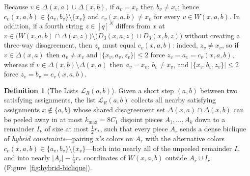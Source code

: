 \documentclass[11pt]{article}
\theoremstyle{definition}
\newtheorem{definition}[theorem]{Definition}
\theoremstyle{remark}
\begin{document}
Because $v \in \Delta(x, a) \cup \Delta(x, b)$, if $a_v = x_v$ then $b_v \ne x_v$; hence $c_v(x, a, b) \in \{a_v, b_v\} \setminus \{x_v\}$ and $c_v(x, a, b) \ne x_v$ for every $v \in W(x, a, b)$. In addition, if a fourth string $z \in [q]^N$ differs from $x$ at $v \in \bigl(W(x, a, b) \cap \Delta(x, z)\bigr) \setminus \bigl(D_3(x, a, z) \cup D_3(x, b, z)\bigr)$ without creating a three-way disagreement, then $z_v$ must equal $c_v(x, a, b)$: indeed, $z_v \ne x_v$, so if $v \in \Delta(x, a)$ then $a_v \ne x_v$ and $|\{x_v, a_v, z_v\}| \le 2$ force $z_v = a_v = c_v(x, a, b)$, whereas if $v \in \Delta(x, b) \setminus \Delta(x, a)$ then $a_v = x_v$, $b_v \ne x_v$, and $|\{x_v, b_v, z_v\}| \le 2$ force $z_v = b_v = c_v(x, a, b)$.

\begin{definition}[The Lists $\mathcal{L}_R(a, b)$]
\label{def:witness-list}
Given a short step $(a, b)$ between two satisfying assignments, the list $\mathcal{L}_R(a, b)$ collects all nearby satisfying assignments $x \notin \{a, b\}$ whose shared disagreement set $\Delta(x, a) \cap \Delta(x, b)$ can be peeled away in at most $k_{\max} = 8 C_1$ disjoint pieces $A_1, \dots, A_k$ down to a remainder $I_k$ of size at most $\frac{1}{2} r_*$, such that every piece $A_r$ sends a dense biclique of \emph{hybrid constraints}---pairing $x$'s colors on $A_r$ with the alternative colors $c_v(x, a, b) \in \{a_v, b_v\} \setminus \{x_v\}$---both into nearly all of the unpeeled remainder $I_r$ and into nearly $|A_r| - \frac{1}{4} r_*$ coordinates of $W(x, a, b)$ outside $A_r \cup I_r$ (Figure~\ref{fig:hybrid-biclique}).


\end{definition}
\end{document}
